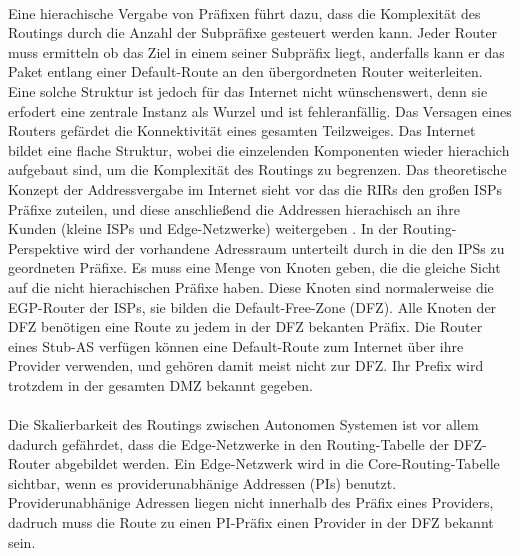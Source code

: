 \paragraph{}
Eine hierachische Vergabe von Präfixen führt dazu, dass die Komplexität des Routings durch die Anzahl der Subpräfixe gesteuert werden kann. Jeder Router muss ermitteln ob das Ziel in einem seiner Subpräfix liegt, anderfalls kann er das Paket entlang einer Default-Route an den übergordneten Router weiterleiten. Eine solche Struktur ist jedoch für das Internet nicht wünschenswert, denn sie erfodert eine zentrale Instanz als Wurzel und ist fehleranfällig. Das Versagen eines Routers gefärdet die Konnektivität eines gesamten Teilzweiges. Das Internet bildet eine flache Struktur, wobei die einzelenden Komponenten wieder hierachich aufgebaut sind, um die Komplexität des Routings zu begrenzen. Das theoretische Konzept der Addressvergabe im Internet sieht vor das die RIRs den großen ISPs Präfixe zuteilen, und diese anschließend die Addressen hierachisch an ihre Kunden (kleine ISPs und Edge-Netzwerke) weitergeben \cite{journals/ccr/MengXZHLZ04}. In der Routing-Perspektive wird der vorhandene Adressraum unterteilt durch in die den IPSs zu geordneten Präfixe. Es muss eine Menge von Knoten geben, die die gleiche Sicht auf die nicht hierachischen Präfixe haben. Diese Knoten sind normalerweise die EGP-Router der ISPs, sie bilden die Default-Free-Zone (DFZ). Alle Knoten der DFZ benötigen eine Route zu jedem in der DFZ bekanten Präfix. Die Router eines Stub-AS verfügen können eine Default-Route zum Internet über ihre Provider verwenden, und gehören damit meist nicht zur DFZ. Ihr Prefix wird trotzdem in der gesamten DMZ bekannt gegeben. 

\paragraph{}
Die Skalierbarkeit des Routings zwischen Autonomen Systemen ist vor allem dadurch gefährdet, dass die Edge-Netzwerke in den Routing-Tabelle der DFZ-Router abgebildet werden.
Ein Edge-Netzwerk wird in die Core-Routing-Tabelle sichtbar, wenn es providerunabhänige Addressen (PIs) benutzt. Providerunabhänige Adressen liegen nicht innerhalb des Präfix eines Providers, dadruch muss die Route zu einen PI-Präfix einen Provider in der DFZ bekannt sein.

